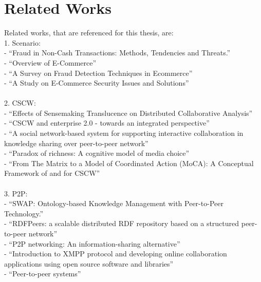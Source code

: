 
\chapter{Related Works}
\label{cha:related_works}

Related works, that are referenced for this thesis, are: \\

1. Scenario: \\
- ``Fraud in Non-Cash Transactions: Methods, Tendencies and Threats.'' \citep{sobko2014fraud} \\
- ``Overview of E-Commerce'' \citep{ankhule2015overview} \\
- ``A Survey on Fraud Detection Techniques in Ecommerce'' \citep{rana2015survey} \\
- ``A Study on E-Commerce Security Issues and Solutions'' \citep{sen2015study} \\
\\
2. CSCW: \\
- ``Effects of Sensemaking Translucence on Distributed Collaborative Analysis'' \citep{goyaleffects} \\
- ``CSCW and enterprise 2.0 - towards an integrated perspective'' \citep{Koch2008} \\
- ``A social network-based system for supporting interactive collaboration in knowledge sharing over peer-to-peer network'' \citep{yang2008social} \\
- ``Paradox of richness: A cognitive model of media choice'' \citep{robert2005paradox} \\
- ``From The Matrix to a Model of Coordinated Action (MoCA): A Conceptual Framework of and for CSCW'' \citep{lee2015matrix} \\
\\
3. P2P: \\
- ``SWAP: Ontology-based Knowledge Management with Peer-to-Peer Technology.'' \citep{ehrig2003swap} \\
- ``RDFPeers: a scalable distributed RDF repository based on a structured peer-to-peer network'' \citep{cai2004rdfpeers} \\
- ``P2P networking: An information-sharing alternative'' \citep{parameswaran2001p2p} \\
- ``Introduction to XMPP protocol and developing online collaboration applications using open source software and libraries'' \citep{ozturk2010introduction} \\
- ``Peer-to-peer systems'' \citep{rodrigues2010peer} \\
